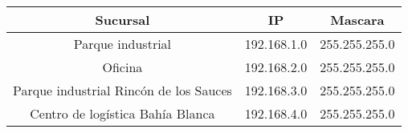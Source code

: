 \begin{tabular}{|c|c|c|}
    \hline Sucursal & IP & Mascara \\
    \hline Parque industrial & 192.168.1.0 & 255.255.255.0 \\ 
    \hline Oficina & 192.168.2.0 & 255.255.255.0 \\  
    \hline Parque industrial Rincón de los Sauces  & 192.168.3.0 & 255.255.255.0 \\
    \hline Centro de logística Bahía Blanca & 192.168.4.0 & 255.255.255.0 \\     
    \hline
\end{tabular}